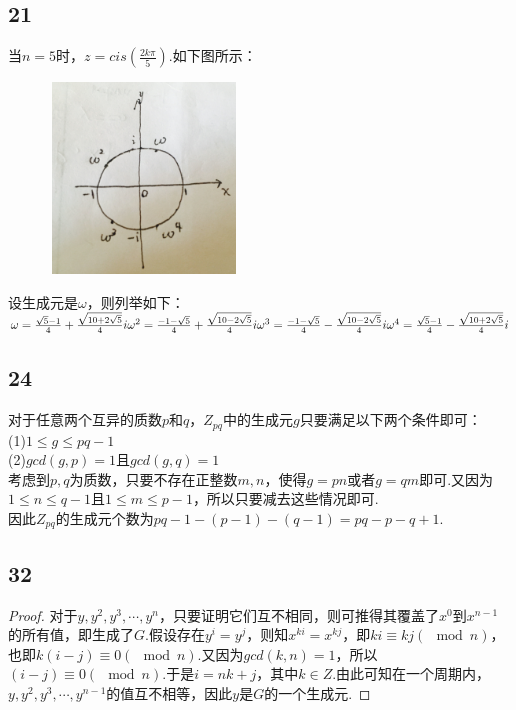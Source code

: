\documentclass[twocolumn]{article}
\newenvironment{SChinese}{
	\CJKfamily{gbsn}
	\CJKtilde
	\CJKnospace}{}
\begin{document}
\begin{CJK}{UTF8}{}
\begin{SChinese}
				\subsection*{21}
					当$n=5$时，$z=cis(\frac{2k\pi}{5})$.如下图所示：\\
					\begin{figure}[!h]
						\centering
						\includegraphics[width=2in,height=2in]{233.png}
					\end{figure}
					设生成元是$\omega$，则列举如下：\\$
						\omega=\frac{\sqrt{5}-1}{4}+\frac{\sqrt{10+2\sqrt{5}}}{4}i\\
						\omega^2=\frac{-1-\sqrt{5}}{4}+\frac{\sqrt{10-2\sqrt{5}}}{4}i\\
						\omega^3=\frac{-1-\sqrt{5}}{4}-\frac{\sqrt{10-2\sqrt{5}}}{4}i\\
						\omega^4=\frac{\sqrt{5}-1}{4}-\frac{\sqrt{10+2\sqrt{5}}}{4}i\\
					$
				\subsection*{24}
					对于任意两个互异的质数$p$和$q$，$Z_{pq}$中的生成元$g$只要满足以下两个条件即可：\\
					(1)$1\le g\le pq-1$\\
					(2)$gcd(g,p)=1$且$gcd(g,q)=1$\\
					考虑到$p,q$为质数，只要不存在正整数$m,n$，使得$g=pn$或者$g=qm$即可.又因为$1\le n\le q-1$且$1\le m\le p-1$，所以只要减去这些情况即可.\\
					因此$Z_{pq}$的生成元个数为$pq-1-(p-1)-(q-1)=pq-p-q+1$.
				\subsection*{32}
					\begin{proof}
						对于$y,y^2,y^3,\cdots,y^n$，只要证明它们互不相同，则可推得其覆盖了$x^0$到$x^{n-1}$的所有值，即生成了$G$.假设存在$y^i=y^j$，则知$x^{ki}=x^{kj}$，即$ki\equiv kj(\mod n)$，也即$k(i-j)\equiv0(\mod n)$.又因为$gcd(k,n)=1$，所以$(i-j)\equiv0(\mod n)$.于是$i=nk+j$，其中$k\in Z$.由此可知在一个周期内，$y,y^2,y^3,\cdots,y^{n-1}$的值互不相等，因此$y$是$G$的一个生成元.
					\end{proof}

\end{SChinese}
\end{CJK}
\end{document}
